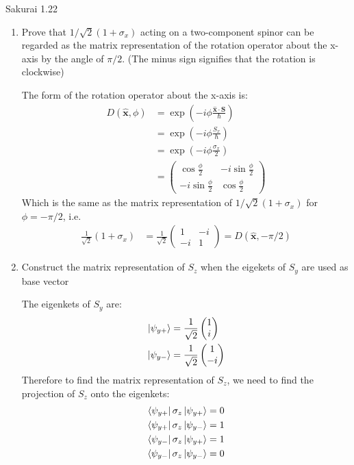 \documentclass{article}
\begin{document}
\newpage
\begin{section}{Sakurai 1.22}
\begin{enumerate}
	\item Prove that $1/\sqrt{2} (1+\sigma_x)$ acting on a two-component spinor can be regarded as the matrix representation of the rotation operator about the x-axis by the angle of $\pi/2$. (The minus sign signifies that the rotation is clockwise)

	\begin{tcolorbox}
		The form of the rotation operator about the x-axis is:
		\begin{align*}
			D(\boldsymbol{\hat x}, \phi)
			 & = \exp(-i \phi \frac{\boldsymbol{\hat x \cdot S}}{\hbar}) \\
			 & = \exp(-i \phi \frac{S_x}{\hbar})                         \\
			 & = \exp(-i \phi \frac{\sigma_x}{2})                        \\
			 & = \begin{pmatrix}
				     \cos \frac{\phi}{2}    & -i \sin \frac{\phi}{2} \\
				     -i \sin \frac{\phi}{2} & \cos \frac{\phi}{2}
			     \end{pmatrix}
		\end{align*}
		Which is the same as the matrix representation of $1/\sqrt{2} (1+\sigma_x)$ for $\phi = -\pi/2$, i.e.
		\begin{align*}
			\frac{1}{\sqrt{2}} (1+\sigma_x)
			 & = \frac{1}{\sqrt{2}}
			\begin{pmatrix}
				1  & -i \\
				-i & 1
			\end{pmatrix}
			= D(\boldsymbol{\hat x}, -\pi/2)
		\end{align*}
	\end{tcolorbox}

	\item Construct the matrix representation of $S_z$ when the eigekets of $S_y$ are used as base vector

	\begin{tcolorbox}
		The eigenkets of $S_y$ are:
		\begin{align*}
			\ket{\psi_{y+}} & = \frac{1}{\sqrt{2}} \begin{pmatrix} 1 \\ i \end{pmatrix}  \\
			\ket{\psi_{y-}} & = \frac{1}{\sqrt{2}} \begin{pmatrix} 1 \\ -i \end{pmatrix}
		\end{align*}
		Therefore to find the matrix representation of $S_z$, we need to find the projection of $S_z$ onto the eigenkets:
		\begin{align*}
			\bra{\psi_{y+}}{\sigma_z}\ket{\psi_{y+}} = 0 \\
			\bra{\psi_{y+}}{\sigma_z}\ket{\psi_{y-}} = 1 \\
			\bra{\psi_{y-}}{\sigma_z}\ket{\psi_{y+}} = 1 \\
			\bra{\psi_{y-}}{\sigma_z}\ket{\psi_{y-}} = 0
		\end{align*}


\end{tcolorbox}
\end{enumerate}
\end{section}
\end{document}
